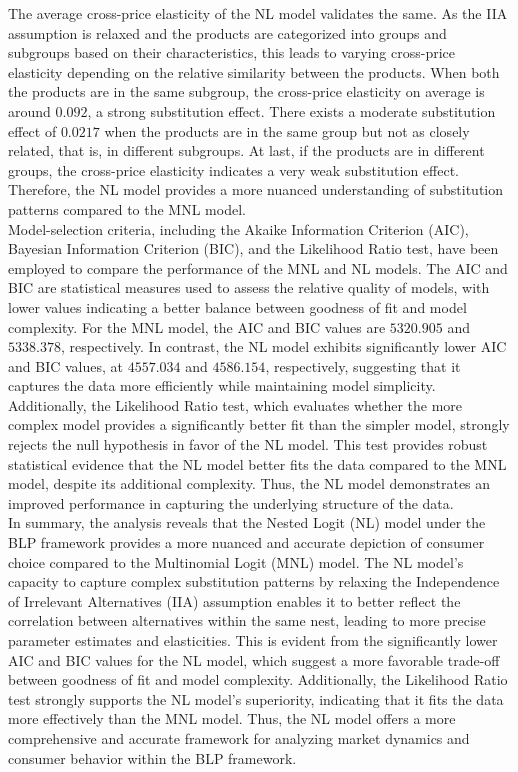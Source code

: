 \documentclass[a4paper,11pt]{article}
\begin{document}
    The average cross-price elasticity of the NL model validates the same. As the IIA assumption is relaxed and the products are categorized into groups and subgroups based on their characteristics, this leads to varying cross-price elasticity depending on the relative similarity between the products. When both the products are in the same subgroup, the cross-price elasticity on average is around $0.092$, a strong substitution effect. There exists a moderate substitution effect of $0.0217$ when the products are in the same group but not as closely related, that is, in different subgroups. At last, if the products are in different groups, the cross-price elasticity indicates a very weak substitution effect. Therefore, the NL model provides a more nuanced understanding of substitution patterns compared to the MNL model.\\
    
   Model-selection criteria, including the Akaike Information Criterion (AIC), Bayesian Information Criterion (BIC), and the Likelihood Ratio test, have been employed to compare the performance of the MNL and NL models. The AIC and BIC are statistical measures used to assess the relative quality of models, with lower values indicating a better balance between goodness of fit and model complexity. For the MNL model, the AIC and BIC values are $5320.905$ and $5338.378$, respectively. In contrast, the NL model exhibits significantly lower AIC and BIC values, at $4557.034$ and $4586.154$, respectively, suggesting that it captures the data more efficiently while maintaining model simplicity. Additionally, the Likelihood Ratio test, which evaluates whether the more complex model provides a significantly better fit than the simpler model, strongly rejects the null hypothesis in favor of the NL model. This test provides robust statistical evidence that the NL model better fits the data compared to the MNL model, despite its additional complexity. Thus, the NL model demonstrates an improved performance in capturing the underlying structure of the data.\\

    In summary, the analysis reveals that the Nested Logit (NL) model under the BLP framework provides a more nuanced and accurate depiction of consumer choice compared to the Multinomial Logit (MNL) model. The NL model's capacity to capture complex substitution patterns by relaxing the Independence of Irrelevant Alternatives (IIA) assumption enables it to better reflect the correlation between alternatives within the same nest, leading to more precise parameter estimates and elasticities. This is evident from the significantly lower AIC and BIC values for the NL model, which suggest a more favorable trade-off between goodness of fit and model complexity. Additionally, the Likelihood Ratio test strongly supports the NL model's superiority, indicating that it fits the data more effectively than the MNL model. Thus, the NL model offers a more comprehensive and accurate framework for analyzing market dynamics and consumer behavior within the BLP framework.\\
\end{document}
